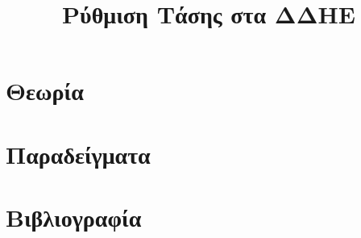 \title{Ρύθμιση Τάσης στα ΔΔΗΕ}

\section{Θεωρία}
\label{kef-05-theoria}

\section{Παραδείγματα}
\label{kef-05-paradeigmata}

\section{Βιβλιογραφία}
\label{kef-05-vivliografia}
